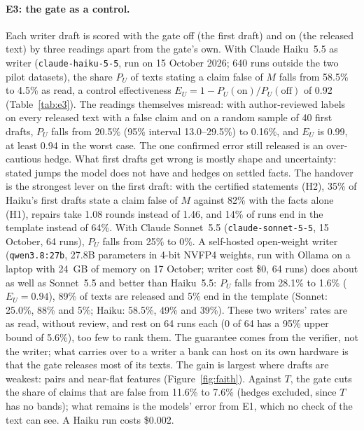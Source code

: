 \documentclass[11pt]{article}
\newcommand{\dsl}[1]{\texttt{#1}}
\begin{document}
\paragraph{E3: the gate as a control.} Each writer draft is scored with the gate off (the first draft) and on (the
released text) by three readings apart from the gate's own. With Claude Haiku~5.5 as writer (\dsl{claude-haiku-5-5},
run on 15 October 2026; 640 runs outside the two pilot datasets), the share $P_U$ of texts stating a claim false of
$M$ falls from 58.5\% to 4.5\% as read, a control effectiveness $E_U = 1 - P_U(\text{on}) / P_U(\text{off})$
\citep{garcialorite2026distributional} of 0.92 (Table~\ref{tab:e3}). The readings themselves misread: with
author-reviewed labels on every released text with a false claim and on a random sample of 40 first drafts, $P_U$
falls from 20.5\% (95\% interval 13.0--29.5\%) to 0.16\%, and $E_U$ is 0.99, at least 0.94 in the worst case. The one
confirmed error still released is an over-cautious hedge. What first drafts get wrong is mostly shape and uncertainty:
stated jumps the model does not have and hedges on settled facts. The handover is the strongest lever on the first
draft: with the certified statements (H2), 35\% of Haiku's first drafts state a claim false of $M$ against 82\% with
the facts alone (H1), repairs take 1.08 rounds instead of 1.46, and 14\% of runs end in the template instead of 64\%.
With Claude Sonnet~5.5 (\dsl{claude-sonnet-5-5}, 15 October, 64 runs), $P_U$ falls from 25\% to 0\%. A self-hosted
open-weight writer (\dsl{qwen3.8:27b}, 27.8B parameters in 4-bit NVFP4 weights, run with Ollama on a laptop with
24~GB of memory on 17 October; writer cost \$0, 64 runs) does about as well as Sonnet~5.5 and better than
Haiku~5.5: $P_U$ falls from 28.1\% to 1.6\% ($E_U = 0.94$), 89\% of texts are released and 5\% end in the template
(Sonnet: 25.0\%, 88\% and 5\%; Haiku: 58.5\%, 49\% and 39\%). These two writers' rates are as read, without review,
and rest on 64 runs each (0 of 64 has a 95\% upper bound of 5.6\%), too few to rank them. The guarantee comes from the
verifier, not the writer; what carries over to a writer a bank can host on its own hardware is that the gate
releases most of its texts. The gain is largest where drafts are weakest: pairs and near-flat features (Figure~\ref{fig:faith}). Against $T$, the
gate cuts the share of claims that are false from 11.6\% to 7.6\% (hedges excluded, since $T$ has no bands); what
remains is the models' error from E1, which no check of the text can see. A Haiku run costs \$0.002.
\end{document}
